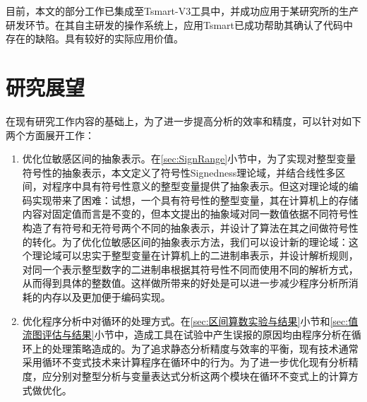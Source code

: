 目前，本文的部分工作已集成至Tsmart-V3工具中，并成功应用于某研究所的生产研发环节。在其自主研发的操作系统上，应用Tsmart已成功帮助其确认了代码中存在的缺陷。具有较好的实际应用价值。

\section{研究展望}

在现有研究工作内容的基础上，为了进一步提高分析的效率和精度，可以针对如下两个方面展开工作：

\begin{enumerate}[1）]
	\item 优化位敏感区间的抽象表示。在\ref{sec:SignRange}小节中，为了实现对整型变量符号性的抽象表示，本文定义了符号性Signedness理论域，并结合线性多区间，对程序中具有符号性意义的整型变量提供了抽象表示。但这对理论域的编码实现带来了困难：试想，一个具有符号性的整型变量，其在计算机上的存储内容对固定值而言是不变的，但本文提出的抽象域对同一数值依据不同符号性构造了有符号和无符号两个不同的抽象表示，并设计了算法在其之间做符号性的转化。为了优化位敏感区间的抽象表示方法，我们可以设计新的理论域：这个理论域可以忠实于整型变量在计算机上的二进制串表示，并设计解析规则，对同一个表示整型数字的二进制串根据其符号性不同而使用不同的解析方式，从而得到具体的整数值。这样做所带来的好处是可以进一步减少程序分析所消耗的内存以及更加便于编码实现。
	
	\item 优化程序分析中对循环的处理方式。在\ref{sec:区间算数实验与结果}小节和\ref{sec:值流图评估与结果}小节中，造成工具在试验中产生误报的原因均由程序分析在循环上的处理策略造成的。为了追求静态分析精度与效率的平衡，现有技术通常采用循环不变式技术来计算程序在循环中的行为。为了进一步优化现有分析精度，应分别对整型分析与变量表达式分析这两个模块在循环不变式上的计算方式做优化。
\end{enumerate}


